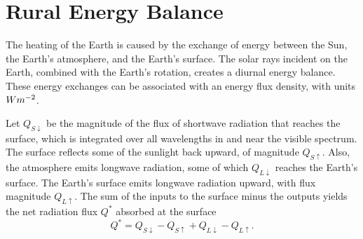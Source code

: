 \section{Rural Energy Balance}
	The heating of the Earth is caused by the exchange of energy between the Sun, the Earth's atmosphere, and the Earth's surface.
	The solar rays incident on the Earth, combined with the Earth's rotation, creates a diurnal energy balance.
	These energy exchanges can be associated with an energy flux density, with units $W \space m^{-2}$.
	
	Let $Q_{S\downarrow}$ be the magnitude of the flux of shortwave radiation that reaches the surface, which is integrated over all wavelengths in and near	the visible spectrum.
	The surface reflects some of the sunlight back upward, of magnitude $Q_{S\uparrow}$.
	Also, the atmosphere emits longwave radiation, some of which
	$Q_{L\downarrow}$ reaches the Earth’s surface.
	The Earth’s surface emits longwave radiation upward, with flux magnitude $Q_{L\uparrow}$. 
	The sum of the inputs to the surface minus the outputs yields the net radiation flux $Q^*$ absorbed at the
	surface
	\begin{equation}
		Q^* = Q_{S\downarrow} - Q_{S\uparrow} + Q_{L\downarrow} - Q_{L\uparrow}.
	\end{equation}
	

